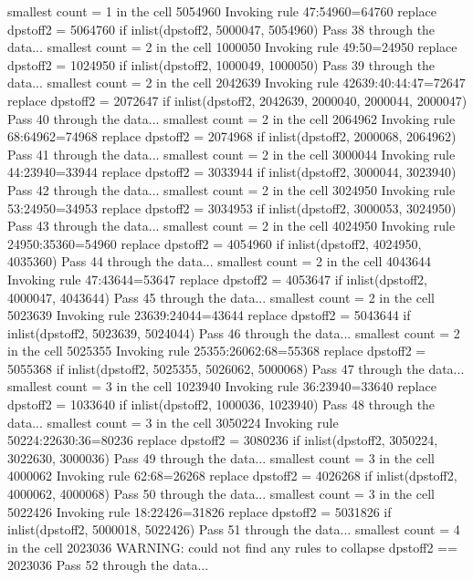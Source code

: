   smallest count = 1 in the cell      5054960
  Invoking rule 47:54960=64760
  replace dpstoff2 = 5064760 if inlist(dpstoff2, 5000047, 5054960)
Pass 38 through the data...
  smallest count = 2 in the cell      1000050
  Invoking rule 49:50=24950
  replace dpstoff2 = 1024950 if inlist(dpstoff2, 1000049, 1000050)
Pass 39 through the data...
  smallest count = 2 in the cell      2042639
  Invoking rule 42639:40:44:47=72647
  replace dpstoff2 = 2072647 if inlist(dpstoff2, 2042639, 2000040, 2000044, 2000047)
Pass 40 through the data...
  smallest count = 2 in the cell      2064962
  Invoking rule 68:64962=74968
  replace dpstoff2 = 2074968 if inlist(dpstoff2, 2000068, 2064962)
Pass 41 through the data...
  smallest count = 2 in the cell      3000044
  Invoking rule 44:23940=33944
  replace dpstoff2 = 3033944 if inlist(dpstoff2, 3000044, 3023940)
Pass 42 through the data...
  smallest count = 2 in the cell      3024950
  Invoking rule 53:24950=34953
  replace dpstoff2 = 3034953 if inlist(dpstoff2, 3000053, 3024950)
Pass 43 through the data...
  smallest count = 2 in the cell      4024950
  Invoking rule 24950:35360=54960
  replace dpstoff2 = 4054960 if inlist(dpstoff2, 4024950, 4035360)
Pass 44 through the data...
  smallest count = 2 in the cell      4043644
  Invoking rule 47:43644=53647
  replace dpstoff2 = 4053647 if inlist(dpstoff2, 4000047, 4043644)
Pass 45 through the data...
  smallest count = 2 in the cell      5023639
  Invoking rule 23639:24044=43644
  replace dpstoff2 = 5043644 if inlist(dpstoff2, 5023639, 5024044)
Pass 46 through the data...
  smallest count = 2 in the cell      5025355
  Invoking rule 25355:26062:68=55368
  replace dpstoff2 = 5055368 if inlist(dpstoff2, 5025355, 5026062, 5000068)
Pass 47 through the data...
  smallest count = 3 in the cell      1023940
  Invoking rule 36:23940=33640
  replace dpstoff2 = 1033640 if inlist(dpstoff2, 1000036, 1023940)
Pass 48 through the data...
  smallest count = 3 in the cell      3050224
  Invoking rule 50224:22630:36=80236
  replace dpstoff2 = 3080236 if inlist(dpstoff2, 3050224, 3022630, 3000036)
Pass 49 through the data...
  smallest count = 3 in the cell      4000062
  Invoking rule 62:68=26268
  replace dpstoff2 = 4026268 if inlist(dpstoff2, 4000062, 4000068)
Pass 50 through the data...
  smallest count = 3 in the cell      5022426
  Invoking rule 18:22426=31826
  replace dpstoff2 = 5031826 if inlist(dpstoff2, 5000018, 5022426)
Pass 51 through the data...
  smallest count = 4 in the cell      2023036
  WARNING: could not find any rules to collapse dpstoff2 == 2023036
Pass 52 through the data...
